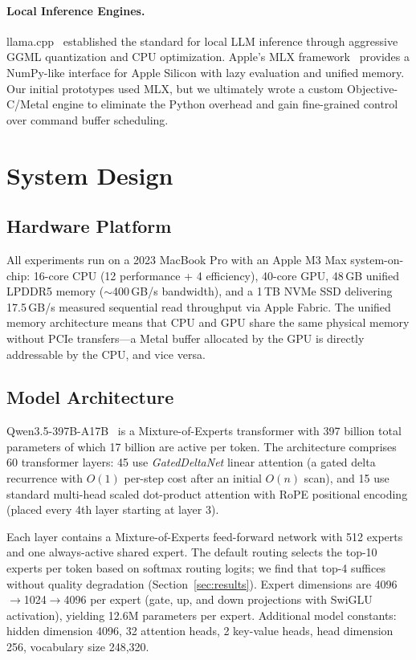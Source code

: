 \documentclass[11pt,twocolumn]{article}
\begin{document}
\paragraph{Local Inference Engines.}
llama.cpp~\cite{llamacpp} established the standard for local LLM inference through aggressive GGML quantization and CPU optimization.
Apple's MLX framework~\cite{mlx2023} provides a NumPy-like interface for Apple Silicon with lazy evaluation and unified memory.
Our initial prototypes used MLX, but we ultimately wrote a custom Objective-C/Metal engine to eliminate the Python overhead and gain fine-grained control over command buffer scheduling.

\section{System Design}

\subsection{Hardware Platform}

All experiments run on a 2023 MacBook Pro with an Apple M3 Max system-on-chip:
16-core CPU (12 performance + 4 efficiency), 40-core GPU, 48\,GB unified LPDDR5 memory ($\sim$400\,GB/s bandwidth), and a 1\,TB NVMe SSD delivering 17.5\,GB/s measured sequential read throughput via Apple Fabric.
The unified memory architecture means that CPU and GPU share the same physical memory without PCIe transfers---a Metal buffer allocated by the GPU is directly addressable by the CPU, and vice versa.

\subsection{Model Architecture}

Qwen3.5-397B-A17B~\cite{yang2025qwen3} is a Mixture-of-Experts transformer with 397 billion total parameters of which 17 billion are active per token.
The architecture comprises 60 transformer layers: 45 use \emph{GatedDeltaNet} linear attention (a gated delta recurrence with $O(1)$ per-step cost after an initial $O(n)$ scan), and 15 use standard multi-head scaled dot-product attention with RoPE positional encoding (placed every 4th layer starting at layer 3).

Each layer contains a Mixture-of-Experts feed-forward network with 512 experts and one always-active shared expert.
The default routing selects the top-10 experts per token based on softmax routing logits; we find that top-4 suffices without quality degradation (Section~\ref{sec:results}).
Expert dimensions are 4096$\to$1024$\to$4096 per expert (gate, up, and down projections with SwiGLU activation), yielding 12.6M parameters per expert.
Additional model constants: hidden dimension 4096, 32 attention heads, 2 key-value heads, head dimension 256, vocabulary size 248{,}320.
\end{document}

